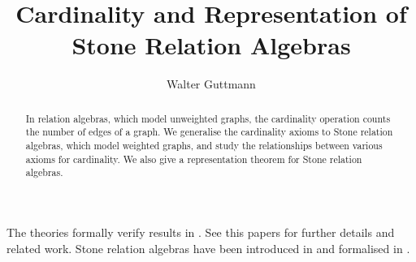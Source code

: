 \documentclass[11pt,a4paper]{article}
\begin{document}
\title{Cardinality and Representation of Stone Relation Algebras}
\author{Walter Guttmann}
\maketitle

\begin{abstract}
  In relation algebras, which model unweighted graphs, the cardinality operation counts the number of edges of a graph.
  We generalise the cardinality axioms to Stone relation algebras, which model weighted graphs, and study the relationships between various axioms for cardinality.
  We also give a representation theorem for Stone relation algebras.
\end{abstract}

\tableofcontents

\bigskip

\noindent
The theories formally verify results in \cite{FurusawaGuttmann2023}.
See this papers for further details and related work.
Stone relation algebras have been introduced in \cite{Guttmann2017b} and formalised in \cite{Guttmann2017a}.

\begin{flushleft}

\end{flushleft}



\end{document}
